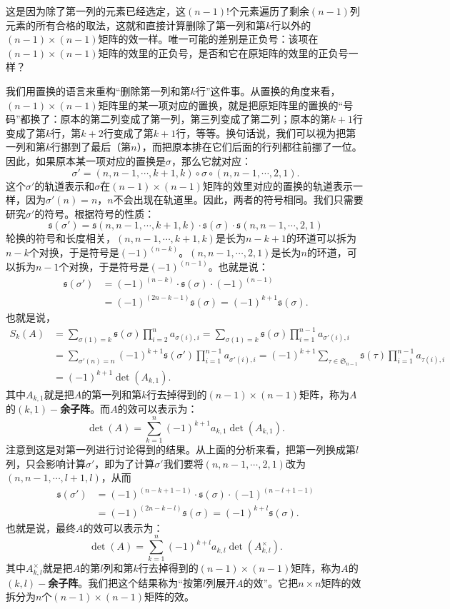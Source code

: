 \documentclass[12pt,UTF8,fontset=none]{ctexbook}
\begin{document}
这是因为除了第一列的元素已经选定，这$(n-1)!$个元素遍历了剩余$(n-1)$列元素的所有合格的取法，这就和直接计算删除了第一列和第$k$行以外的$(n-1)\times (n-1)$矩阵的效一样。唯一可能的差别是正负号：该项在$(n-1)\times (n-1)$矩阵的效里的正负号，是否和它在原矩阵的效里的正负号一样？

我们用置换的语言来重构“删除第一列和第$k$行”这件事。从置换的角度来看，$(n-1)\times (n-1)$矩阵里的某一项对应的置换，就是把原矩阵里的置换的“号码”都换了：原本的第二列变成了第一列，第三列变成了第二列；原本的第$k+1$行变成了第$k$行，第$k+2$行变成了第$k+1$行，等等。换句话说，我们可以视为把第一列和第$k$行挪到了最后（第$n$），而把原本排在它们后面的行列都往前挪了一位。因此，如果原本某一项对应的置换是$\sigma$，那么它就对应：
$$
\sigma' = (n,n-1,\cdots,k+1,k)\circ\sigma \circ(n,n-1,\cdots, 2,1).
$$
这个$\sigma'$的轨道表示和$\sigma$在$(n-1)\times (n-1)$矩阵的效里对应的置换的轨道表示一样，因为$\sigma'(n)=n$，$n$不会出现在轨道里。因此，两者的符号相同。我们只需要研究$\sigma'$的符号。根据符号的性质：
$$
\mathfrak{s} (\sigma') = \mathfrak{s}(n,n-1,\cdots,k+1,k)\cdot \mathfrak{s}(\sigma)\cdot \mathfrak{s}(n,n-1,\cdots, 2,1)
$$
轮换的符号和长度相关，$(n,n-1,\cdots,k+1,k)$是长为$n-k+1$的环道可以拆为$n-k$个对换，于是符号是$(-1)^{(n-k)}$。$(n,n-1,\cdots,2,1)$是长为$n$的环道，可以拆为$n-1$个对换，于是符号是$(-1)^{(n-1)}$。也就是说：
\begin{align*}
    \mathfrak{s} (\sigma') &= (-1)^{(n-k)}\cdot \mathfrak{s}(\sigma) \cdot (-1)^{(n-1)} \\
    &= (-1)^{(2n-k-1)}\mathfrak{s}(\sigma) = (-1)^{k+1}\mathfrak{s}(\sigma).
\end{align*}
也就是说，
\begin{align*}
    S_k(A) &= \sum_{\sigma(1)=k} \mathfrak{s}(\sigma) \prod_{i=2}^n a_{\sigma(i),i} = \sum_{\sigma(1)=k} \mathfrak{s}(\sigma) \prod_{i=1}^{n-1} a_{\sigma'(i),i} \\
    &= \sum_{\sigma'(n)=n} (-1)^{k+1}\mathfrak{s}(\sigma') \prod_{i=1}^{n-1} a_{\sigma'(i),i} = (-1)^{k+1}\sum_{\tau\in\mathfrak{S}_{n-1}} \mathfrak{s}(\tau) \prod_{i=1}^{n-1} a_{\tau(i),i} \\
    &= (-1)^{k+1} \det(A_{k,1}).
\end{align*}
其中$A_{k,1}$就是把$A$的第一列和第$k$行去掉得到的$(n-1)\times (n-1)$矩阵，称为$A$的$(k,1)-$\textbf{余子阵}。而$A$的效可以表示为：
$$
\det(A) = \sum_{k=1}^n (-1)^{k+1} a_{k,1} \det(A_{k,1}).
$$
注意到这是对第一列进行讨论得到的结果。从上面的分析来看，把第一列换成第$l$列，只会影响计算$\sigma'$，即为了计算$\sigma'$我们要将$(n,n-1,\cdots, 2,1)$改为$(n,n-1,\cdots,l+1,l)$，从而
\begin{align*}
    \mathfrak{s} (\sigma') &= (-1)^{(n-k+1-1)}\cdot \mathfrak{s}(\sigma) \cdot (-1)^{(n-l+1-1)} \\
    &= (-1)^{(2n-k-l)}\mathfrak{s}(\sigma) = (-1)^{k+l}\mathfrak{s}(\sigma).
\end{align*}
也就是说，最终$A$的效可以表示为：
$$
\det(A) = \sum_{k=1}^n (-1)^{k+l} a_{k,l} \det(A_{k,l}^{\times}).
$$
其中$A_{k,l}^{\times}$就是把$A$的第$l$列和第$k$行去掉得到的$(n-1)\times (n-1)$矩阵，称为$A$的$(k,l)-$\textbf{余子阵}。我们把这个结果称为“按第$l$列展开$A$的效”。它把$n\times n$矩阵的效拆分为$n$个$(n-1)\times (n-1)$矩阵的效。
\end{document}
